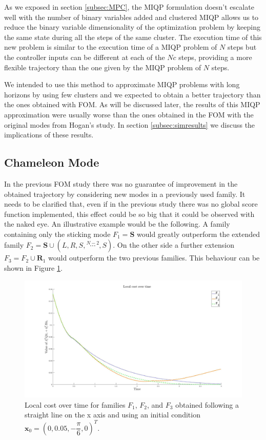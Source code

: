 \documentclass[12,twoside]{TFG-GM}
\theoremstyle{definition}
\theoremstyle{remark}
\begin{document}
As we exposed in section \ref{subsec:MPC}, the MIQP formulation doesn't escalate well with the number of binary variables added and clustered MIQP allows us to reduce the binary variable dimensionality of the optimization problem by keeping the same state during all the steps of the same cluster. The execution time of this new problem is similar to the execution time of a MIQP problem of $N$ steps but the controller inputs can be different at each of the $N c$ steps, providing a more flexible trajectory than the one given by the MIQP problem of $N$ steps.

We intended to use this method to approximate MIQP problems with long horizons by using few clusters and we expected to obtain a better trajectory than the ones obtained with FOM. As will be discussed later, the results of this MIQP approximation were usually worse than the ones obtained in the FOM with the original modes from Hogan's study. In section \ref{subsec:simresults} we discuss the implications of these results.

\subsection{Chameleon Mode}
\label{subsec:chameleon}

In the previous FOM study there was no guarantee of improvement in the obtained trajectory by considering new modes in a previously used family. It needs to be clarified that, even if in the previous study there was no global score function implemented, this effect could be so big that it could be observed with the naked eye. An illustrative example would be the following. A family containing only the sticking mode $F_1 = \textbf{S}$ would greatly outperform the extended family $F_2 = \textbf{S} \cup (L, R, S, \stackrel{N-2}{\cdots}, S)$. On the other side a further extension $F_3 = F_2 \cup \textbf{R}_1$ would outperform the two previous families. This behaviour can be shown in Figure \ref{fig:non_chameleon}.

\begin{figure}[htb!]
\begin{center}
\includegraphics[width=16cm]{non_chameleon.jpg}
\end{center}
\caption{\label{fig:non_chameleon} \small Local cost over time for families $F_1$, $F_2$, and $F_3$ obtained following a straight line on the x axis and using an initial condition $\textbf{x}_0 = (0, 0.05, - \dfrac{\pi}{6}, 0)^T$.}
\end{figure}
\end{document}
